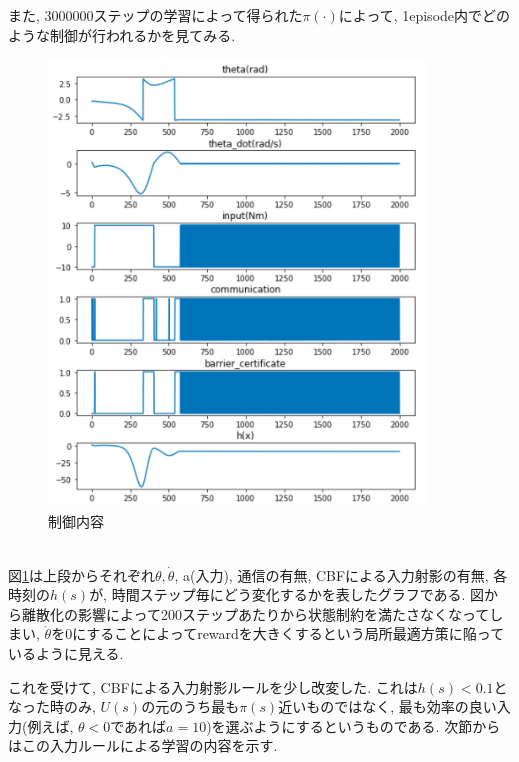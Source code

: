\documentclass{jsarticle}
\begin{document}
また, 3000000ステップの学習によって得られた$\pi(\cdot)$によって, 1episode内でどのような制御が行われるかを見てみる. 
\begin{figure}[h]
	\centering
 	\includegraphics[width=10cm]{pure_control_log.png}
 	\caption{制御内容} \label{pure_control_log}
\end{figure}\\
図\ref{pure_control_log}は上段からそれぞれ$\theta, \dot{\theta}$, a(入力), 通信の有無, CBFによる入力射影の有無, 各時刻の$h(s)$が, 時間ステップ毎にどう変化するかを表したグラフである. 図から離散化の影響によって200ステップあたりから状態制約を満たさなくなってしまい, $\dot{\theta}$を0にすることによってrewardを大きくするという局所最適方策に陥っているように見える. \par

これを受けて, CBFによる入力射影ルールを少し改変した. これは$h(s)<0.1$となった時のみ, $U(s)$の元のうち最も$\pi(s)$近いものではなく, 最も効率の良い入力(例えば, $\theta<0$であれば$a=10$)を選ぶようにするというものである. 次節からはこの入力ルールによる学習の内容を示す.
\end{document}
